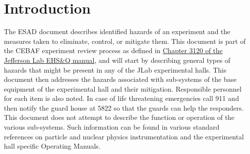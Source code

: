 
\chapter{Introduction}

The ESAD document describes identified hazards of an experiment and the measures taken to eliminate, control, or mitigate them.
This document is part of the CEBAF experiment review process as defined in
\href{http://www.jlab.org/ehs/ehsmanual/manual/3120.html}{Chapter 3120 of the Jefferson Lab EHS\&Q manual},
and will start by describing general types of hazards that might be present in any of the  
JLab experimental halls.  This document then addresses the hazards associated 
with sub-systems of the base equipment of the experimental hall and their 
mitigation.  Responsible personnel for each item is also noted.  
In case of life threatening 
emergencies call 911 and then notify the guard house at 5822 so that the guards can help
the responders.  This document does not attempt to describe the function 
or operation of the various sub-systems. Such information can be found in various 
standard references on particle and nuclear physics instrumentation and the 
experimental hall specific Operating Manuals.

